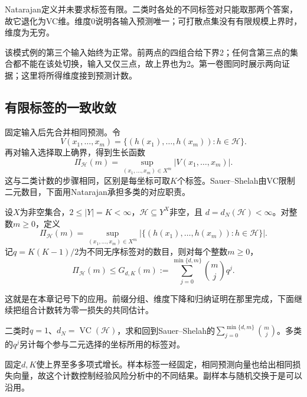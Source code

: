 Natarajan定义并未要求标签有限。二类时各处的不同标签对只能取那两个答案，故它退化为VC维。维度0说明各输入预测唯一；可打散点集没有有限规模上界时，维度为无穷。

该模式例的第三个输入始终为正常。前两点的四组合给下界2；任何含第三点的集合都不能在该处切换，输入又仅三点，故上界也为2。第一卷图同时展示两向证据；这里将所得维度接到预测计数。

\subsection{有限标签的一致收敛}

固定输入后先合并相同预测。令
\[
 V(x_1,\ldots,x_m)
 =\{(h(x_1),\ldots,h(x_m)):h\in\mathcal H\}.
\]
再对输入选择取上确界，得到生长函数
\[
 \Pi_{\mathcal H}(m)=\sup_{(x_1,\ldots,x_m)\in X^m}|V(x_1,\ldots,x_m)|.
\]
这与二类计数的步骤相同，区别是每坐标可取$K$个标签。Sauer--Shelah由VC限制二元数目，下面用Natarajan承担多类的对应职责。

\begin{theorem}[有限标签的预测数目上界]
\label{thm:learning-multiclass-growth-bound}
设$X$为非空集合，$2\leq|Y|=K<\infty$，$\mathcal H\subseteq Y^X$非空，且
$d=d_N(\mathcal H)<\infty$。对整数$m\geq0$，定义
\[
 \Pi_{\mathcal H}(m)
 =\sup_{(x_1,\ldots,x_m)\in X^m}
 \left|\{(h(x_1),\ldots,h(x_m)):h\in\mathcal H\}\right|.
\]
记$q=K(K-1)/2$为不同无序标签对的数目，则对每个整数$m\geq0$，
\[
 \Pi_{\mathcal H}(m)\leq G_{d,K}(m)
 :=\sum_{j=0}^{\min\{d,m\}}\binom mj q^j.
\]
\end{theorem}

这就是在本章记号下的应用。前缀分组、维度下降和归纳证明在那里完成，下面继续把组合计数转为零一损失的共同估计。

二类时$q=1$、$d_N=\operatorname{VC}(\mathcal H)$，求和回到Sauer--Shelah的$\sum_{j=0}^{\min\{d,m\}}\binom mj$。多类的$q^j$另计每个参与二元选择的坐标所用的标签对。

固定$d,K$使上界至多多项式增长。样本标签一经固定，相同预测向量也给出相同损失向量，故这个计数控制经验风险分析中的不同结果。副样本与随机交换于是可以沿用。

